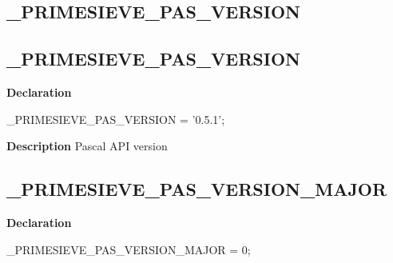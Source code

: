 \documentclass{report}
\newif\ifpdf
\begin{document}
\subsection*{\large{\textbf{{\_}PRIMESIEVE{\_}PAS{\_}VERSION}}\normalsize\hspace{1ex}\hrulefill}
\else
\subsection*{{\_}PRIMESIEVE{\_}PAS{\_}VERSION}
\fi
\label{primesieve-_PRIMESIEVE_PAS_VERSION}
\begin{list}{}{
\setlength{\itemindent}{0cm}
\setlength{\listparindent}{0cm}
\setlength{\leftmargin}{\evensidemargin}
\addtolength{\leftmargin}{\tmplength}
\settowidth{\labelsep}{X}
\addtolength{\leftmargin}{\labelsep}
\setlength{\labelwidth}{\tmplength}
}
\item[\textbf{Declaration}\hfill]
\ifpdf
\begin{flushleft}
\fi
\begin{ttfamily}
{\_}PRIMESIEVE{\_}PAS{\_}VERSION = '0.5.1';\end{ttfamily}

\ifpdf
\end{flushleft}
\fi

\par
\item[\textbf{Description}]
Pascal API version

\end{list}
\ifpdf
\subsection*{\large{\textbf{{\_}PRIMESIEVE{\_}PAS{\_}VERSION{\_}MAJOR}}\normalsize\hspace{1ex}\hrulefill}
\else
\subsection*{{\_}PRIMESIEVE{\_}PAS{\_}VERSION{\_}MAJOR}
\fi
\label{primesieve-_PRIMESIEVE_PAS_VERSION_MAJOR}
\begin{list}{}{
\setlength{\itemindent}{0cm}
\setlength{\listparindent}{0cm}
\setlength{\leftmargin}{\evensidemargin}
\addtolength{\leftmargin}{\tmplength}
\settowidth{\labelsep}{X}
\addtolength{\leftmargin}{\labelsep}
\setlength{\labelwidth}{\tmplength}
}
\item[\textbf{Declaration}\hfill]
\ifpdf
\begin{flushleft}
\fi
\begin{ttfamily}
{\_}PRIMESIEVE{\_}PAS{\_}VERSION{\_}MAJOR = 0;\end{ttfamily}

\ifpdf
\end{flushleft}
\fi

\end{list}
\ifpdf
\end{document}

